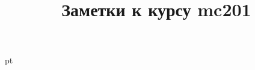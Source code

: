 \documentclass[pdftex,12pt,a4paper]{article}
\title{Заметки к курсу mc201}
\begin{document}
 pt %

\maketitle



\end{document}
